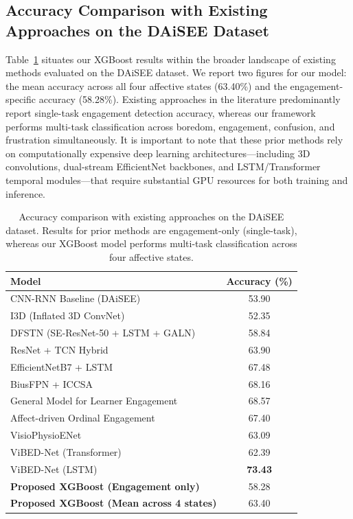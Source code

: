 \subsection{Accuracy Comparison with Existing Approaches on the DAiSEE Dataset}
\label{sec:sota-comparison}

Table~\ref{tab:daisee-sota} situates our XGBoost results within the broader landscape of existing methods evaluated on the DAiSEE dataset. We report two figures for our model: the mean accuracy across all four affective states (63.40\%) and the engagement-specific accuracy (58.28\%). Existing approaches in the literature predominantly report single-task engagement detection accuracy, whereas our framework performs multi-task classification across boredom, engagement, confusion, and frustration simultaneously. It is important to note that these prior methods rely on computationally expensive deep learning architectures---including 3D convolutions, dual-stream EfficientNet backbones, and LSTM/Transformer temporal modules---that require substantial GPU resources for both training and inference.

\begin{table}[t]
\centering
\caption{Accuracy comparison with existing approaches on the DAiSEE dataset. Results for prior methods are engagement-only (single-task), whereas our XGBoost model performs multi-task classification across four affective states.}
\label{tab:daisee-sota}
\begin{tabular}{lc}
\toprule
\textbf{Model} & \textbf{Accuracy (\%)} \\
\midrule
CNN-RNN Baseline (DAiSEE) \cite{gupta2016daisee} & 53.90 \\
I3D (Inflated 3D ConvNet) \cite{zhang2019novel} & 52.35 \\
DFSTN (SE-ResNet-50 + LSTM + GALN) \cite{liao2021deep} & 58.84 \\
ResNet + TCN Hybrid \cite{abedi2021improving} & 63.90 \\
EfficientNetB7 + LSTM \cite{selim2022students} & 67.48 \\
BiusFPN + ICCSA \cite{naveen2025student} & 68.16 \\
General Model for Learner Engagement \cite{malekshahi2024general} & 68.57 \\
Affect-driven Ordinal Engagement \cite{abedi2024affect} & 67.40 \\
VisioPhysioENet \cite{singh2024visiophysioenet} & 63.09 \\
ViBED-Net (Transformer) \cite{gothwal2025vibed} & 62.39 \\
ViBED-Net (LSTM) \cite{gothwal2025vibed} & \textbf{73.43} \\
\midrule
\textbf{Proposed XGBoost (Engagement only)} & 58.28 \\
\textbf{Proposed XGBoost (Mean across 4 states)} & 63.40 \\
\bottomrule
\end{tabular}
\end{table}

